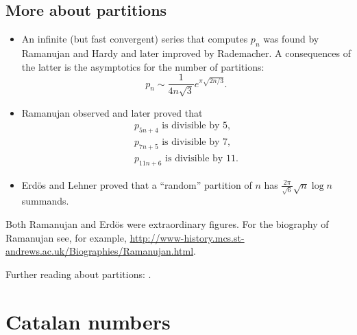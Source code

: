 \begin{page}
\setcounter{section}{4}
\setcounter{subsection}{0}
\setcounter{dfn}{22}
\label{portion:961}

\subsection{More about partitions}
\begin{itemize}
\item 
An infinite (but fast convergent) series that computes $p_n$ was found by Ramanujan and Hardy and later improved by Rademacher.
A consequences of the latter is the asymptotics for the number of partitions:
\[
p_n \sim \frac{1}{4n\sqrt{3}} e^{\pi\sqrt{2n/3}}.
\]
\item
Ramanujan observed and later proved that
\begin{gather*}
p_{5n+4} \text{ is divisible by } 5,\\
p_{7n+5} \text{ is divisible by } 7,\\
p_{11n+6} \text{ is divisible by } 11.
\end{gather*}
\item
Erd\"os and Lehner proved that a ``random'' partition of $n$ has $\frac{2\pi}{\sqrt{6}} \sqrt{n} \log n$ summands.
\end{itemize}

Both Ramanujan and Erd\"os were extraordinary figures.
For the biography of Ramanujan see, for example,
\url{http://www-history.mcs.st-andrews.ac.uk/Biographies/Ramanujan.html}.

Further reading about partitions: \cite{AE04}.


\newpage


\end{page}

\begin{page}
\setcounter{section}{4}
\setcounter{subsection}{1}
\setcounter{dfn}{0}
\label{portion:963}

\section{Catalan numbers}

\end{page}

